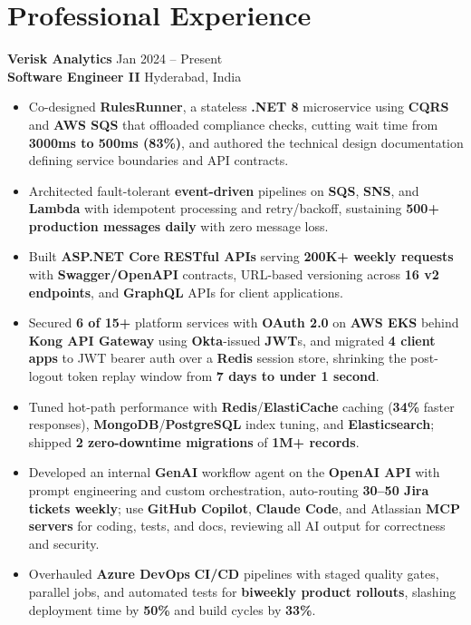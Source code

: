 \documentclass[a4paper,10pt]{article}
\begin{document}
\section*{Professional Experience}

\textbf{Verisk Analytics} \hfill Jan 2024 -- Present \\
\textbf{Software Engineer II} \hfill Hyderabad, India

\begin{itemize}[leftmargin=*]
    \item Co-designed \textbf{RulesRunner}, a stateless \textbf{.NET 8} microservice using \textbf{CQRS} and \textbf{AWS SQS} that offloaded compliance checks, cutting wait time from \textbf{3000ms to 500ms (83\%)}, and authored the technical design documentation defining service boundaries and API contracts.
    \item Architected fault-tolerant \textbf{event-driven} pipelines on \textbf{SQS}, \textbf{SNS}, and \textbf{Lambda} with idempotent processing and retry/backoff, sustaining \textbf{500+ production messages daily} with zero message loss.
    \item Built \textbf{ASP.NET Core} \textbf{RESTful APIs} serving \textbf{200K+ weekly requests} with \textbf{Swagger/OpenAPI} contracts, URL-based versioning across \textbf{16 v2 endpoints}, and \textbf{GraphQL} APIs for client applications.
    \item Secured \textbf{6 of 15+} platform services with \textbf{OAuth 2.0} on \textbf{AWS EKS} behind \textbf{Kong API Gateway} using \textbf{Okta}-issued \textbf{JWT}s, and migrated \textbf{4 client apps} to JWT bearer auth over a \textbf{Redis} session store, shrinking the post-logout token replay window from \textbf{7 days to under 1 second}.
    \item Tuned hot-path performance with \textbf{Redis}/\textbf{ElastiCache} caching (\textbf{34\%} faster responses), \textbf{MongoDB}/\textbf{PostgreSQL} index tuning, and \textbf{Elasticsearch}; shipped \textbf{2 zero-downtime migrations} of \textbf{1M+ records}.
    \item Developed an internal \textbf{GenAI} workflow agent on the \textbf{OpenAI API} with prompt engineering and custom orchestration, auto-routing \textbf{30--50 Jira tickets weekly}; use \textbf{GitHub Copilot}, \textbf{Claude Code}, and Atlassian \textbf{MCP servers} for coding, tests, and docs, reviewing all AI output for correctness and security.
    \item Overhauled \textbf{Azure DevOps} \textbf{CI/CD} pipelines with staged quality gates, parallel jobs, and automated tests for \textbf{biweekly product rollouts}, slashing deployment time by \textbf{50\%} and build cycles by \textbf{33\%}.

\end{itemize}
\end{document}
